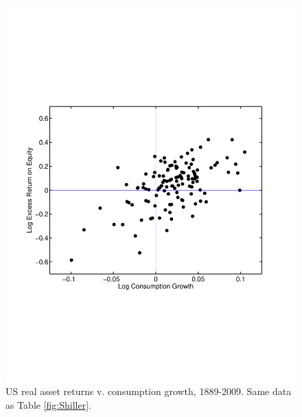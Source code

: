 \documentclass[11pt]{article}
\begin{document}
\pagebreak
\begin{figure}[!h]
\caption{US real asset returns v. consumption growth, 1889-2009.
Same data as Table \ref{fig:Shiller}.}
\centering
\includegraphics[width=\textwidth]{../Code/Matlab/scatter_gxr.pdf}
\end{figure}



\end{document}

